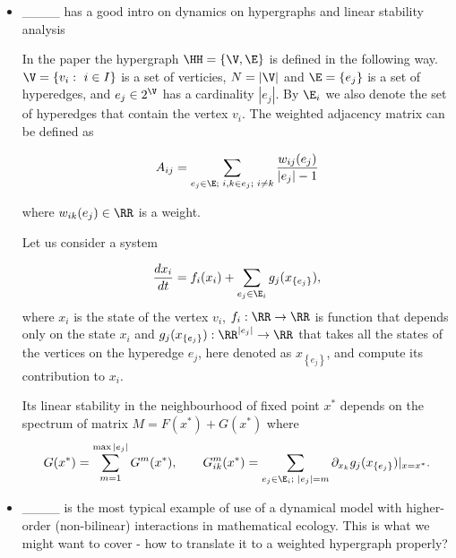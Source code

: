 \begin{itemize}
    \item ____ 
    has a good intro on dynamics on hypergraphs and linear stability analysis
    
    In the paper the hypergraph $\HH =\left\{\V,\E\right\}$ is defined in the following way. $\V=\left\{ v_i:\,\,i\in I\right\}$ is a set of verticies, $N=|\V|$ and $\E=\left\{e_j\right\}$ is a set of hyperedges, and $e_j\in 2^{\V}$ has a cardinality $|e_j|$. By $\E_i$ we also denote the set of hyperedges that contain the vertex $v_i$. The weighted adjacency matrix can be defined as

\[
A_{ij}=\sum_{e_j\in \E;\,\, i,k\in e_j;\,\,i\neq k }\frac{w_{ij}(e_j)}{|e_j|-1}
\]

where $w_{ik}(e_j)\in \RR$ is a weight.

    Let us consider a system

    \begin{equation}\label{eq:main}
\frac{dx_i}{dt}=f_i(x_i)+\sum_{e_j\in \E_i}g_j(x_{\left\{e_j\right\}}),
    \end{equation}
    where $x_i$ is the state of the vertex $v_i$, $f_i:\RR \rightarrow \RR$ is function that depends only on the state $x_i$ and $g_j(x_{\left\{e_j\right\}}):\RR^{|e_j|}\rightarrow \RR$ that takes all the states of the vertices on the hyperedge $e_j$, here denoted as $x_{\left\{e_j\right\}}$, and compute its contribution to $x_i$.

    Its linear stability in the neighbourhood of fixed point $x^*$ depends on the spectrum of matrix $M=F(x^*)+G(x^*)$ where 
    \[
    G(x^*)=\sum_{m=1}^{\max{|e_j|}}G^m(x^*), \qquad G^m_{ik}(x^*)=\sum_{e_j\in \E_i;\,\,|e_j|=m}\partial_{x_k}g_j(x_{\left\{e_j\right\}})|_{x=x^*}.
    \]



    \item ____ is the most typical example of use of a dynamical model with higher-order (non-bilinear) interactions in mathematical ecology. This is what we might want to cover - how to translate it to a weighted hypergraph properly?
    

\end{itemize}
